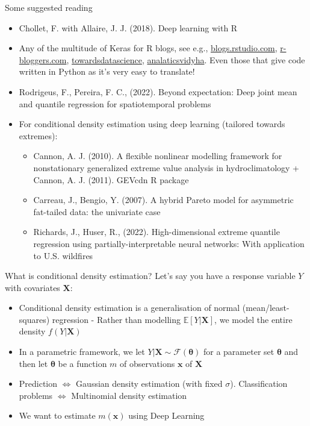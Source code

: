 \documentclass{beamer}
\begin{document}
\begin{frame}{Some suggested reading}
\begin{itemize}
\item Chollet, F. with Allaire, J. J. (2018). Deep learning with R 
\item Any of the multitude of Keras for R blogs, see e.g., \href{https://blogs.rstudio.com/ai/posts/2019-11-27-gettingstarted-2020/}{blogs.rstudio.com}, \href{https://www.r-bloggers.com/2021/12/using-keras-for-deep-learning-with-r/}{r-bloggers.com}, \href{https://towardsdatascience.com/r-vs-python-image-classification-with-keras-1fa99a8fef9b}{towardsdatascience}, \href{https://www.analyticsvidhya.com/blog/2017/06/getting-started-with-deep-learning-using-keras-in-r/}{analaticsvidyha}. Even those that give code written in Python as it's very easy to translate!
\item Rodrigeus, F., Pereira, F. C., (2022). Beyond expectation: Deep joint mean and quantile regression for spatiotemporal problems
\item  For conditional density estimation using deep learning (tailored towards extremes):
\begin{itemize}
\item Cannon, A. J. (2010). A flexible nonlinear modelling framework for nonstationary generalized extreme value analysis in hydroclimatology + Cannon, A. J. (2011). GEVcdn R package
\item  Carreau, J., Bengio, Y. (2007). A hybrid Pareto model for asymmetric fat-tailed data: the univariate case
\item Richards, J., Huser, R., (2022). High-dimensional extreme quantile regression using partially-interpretable neural networks: With application to U.S. wildfires
\end{itemize}
\end{itemize}

\end{frame}
\begin{frame}{What is conditional density estimation?}
Let's say you have a response variable $Y$ with covariates $\mathbf{X}$:
\begin{itemize}
\item Conditional density estimation is a generalisation of normal (mean/least-squares) regression - Rather than modelling $\mathbb{E}[Y|\mathbf{X}]$, we model the entire density $f(Y|\mathbf{X})$
\item In a parametric framework, we let $Y|\mathbf{X}\sim \mathcal{F}(\boldsymbol{\theta})$ for a parameter set $\boldsymbol{\theta}$ and then let $\boldsymbol{\theta}$ be a function $m$ of observations $\mathbf{x}$ of $\mathbf{X}$
\item Prediction $\Leftrightarrow$ Gaussian density estimation (with fixed $\sigma$). Classification problems $\Leftrightarrow$ Multinomial density estimation
\item We want to estimate $m(\mathbf{x})$ using Deep Learning
\end{itemize}

\end{frame}
\end{document}
